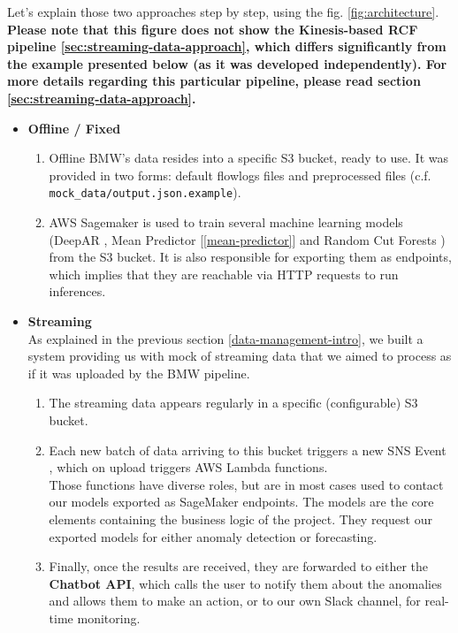 Let's explain those two approaches step by step, using the fig. \ref{fig:architecture}.\\ \textbf{Please note that this figure does not show the Kinesis-based RCF pipeline \ref{sec:streaming-data-approach}, which differs significantly from the example presented below (as it was developed independently). For more details regarding this particular pipeline, please read section \ref{sec:streaming-data-approach}.}
\begin{itemize}
    \item \textbf{Offline / Fixed}
    \begin{enumerate}
        \item Offline BMW's data resides into a specific S3 bucket, ready to use. It was provided in two forms: default flowlogs files and  preprocessed files (c.f. \lstinline{mock_data/output.json.example}).
        \item AWS Sagemaker \cite{awssagemaker} is used to train several machine learning models (DeepAR \cite{awsdeepar}, Mean Predictor [\ref{mean-predictor}] and Random Cut Forests \cite{awsRcf}) from the S3 bucket. It is also responsible for exporting them as endpoints, which implies that they are reachable via HTTP requests to run inferences.
    \end{enumerate}
    
    \item \textbf{Streaming}\\
    As explained in the previous section \ref{data-management-intro}, we built a system providing us with mock of streaming data that we aimed to process as if it was uploaded by the BMW pipeline.
    \begin{enumerate}
        
        \item The streaming data appears regularly in a specific (configurable) S3 bucket. 
        \item Each new batch of data arriving to this bucket triggers a new SNS Event \cite{awssns}, which on upload triggers AWS Lambda \cite{awslambda} functions. \\
        Those functions have diverse roles, but are in most cases used to contact our models exported as SageMaker endpoints. The models are the core elements containing the business logic of the project. They request our exported models for either anomaly detection or forecasting. 
        \item Finally, once the results are received, they are forwarded to either the \textbf{Chatbot API}, which calls the user to notify them about the anomalies and allows them to make an action, or to our own Slack channel, for real-time monitoring.
        
        
    \end{enumerate}
\end{itemize}
